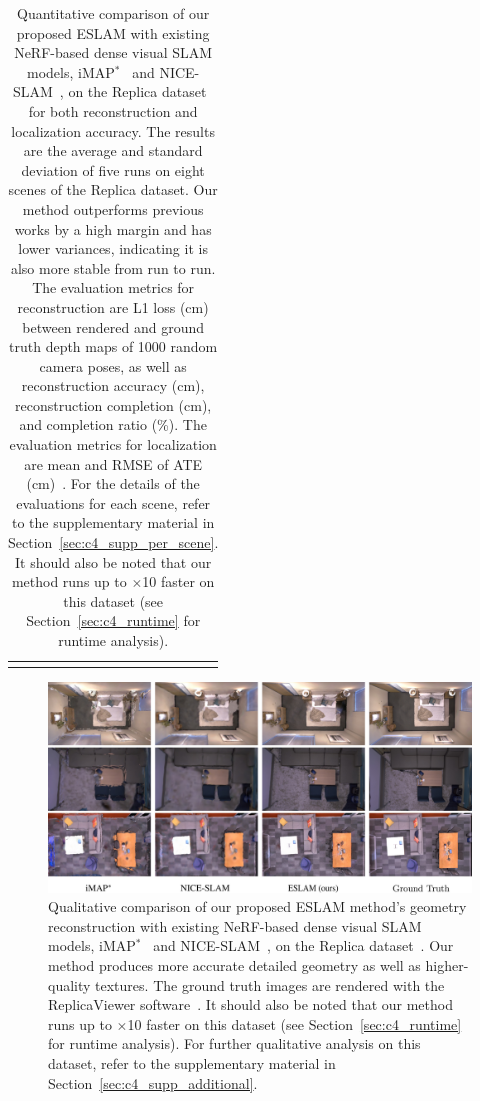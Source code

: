 \begin{table}[t]
\begin{center}
\begin{tabular}{l|cccc}
            \Xhline{2\arrayrulewidth}
        \end{tabular}
    \end{center}
    \caption{Quantitative comparison of our proposed ESLAM with existing NeRF-based dense visual SLAM models, iMAP$^{*}$~\citep{sucar2021imap} and NICE-SLAM~\citep{zhu2022nice}, on the Replica dataset~\citep{replica19arxiv} for both reconstruction and localization accuracy. The results are the average and standard deviation of five runs on eight scenes of the Replica dataset. Our method outperforms previous works by a high margin and has lower variances, indicating it is also more stable from run to run. The evaluation metrics for reconstruction are L1 loss (cm) between rendered and ground truth depth maps of 1000 random camera poses, as well as reconstruction accuracy (cm), reconstruction completion (cm), and completion ratio (\%). The evaluation metrics for localization are mean and RMSE of ATE (cm)~\citep{sturm2012benchmark}. For the details of the evaluations for each scene, refer to the supplementary material in Section~\ref{sec:c4_supp_per_scene}. It should also be noted that our method runs up to $\times$10 faster on this dataset (see Section~\ref{sec:c4_runtime} for runtime analysis).}
    \label{table:quantitative_replica}
\end{table}

\begin{figure}[t]
    \begin{center}
        \includegraphics[width=1.0\linewidth]{images/chapter4/figures/Fig3.jpg}
    \end{center}
    \caption{Qualitative comparison of our proposed ESLAM method's geometry reconstruction with existing NeRF-based dense visual SLAM models, iMAP$^*$~\citep{sucar2021imap} and NICE-SLAM~\citep{zhu2022nice}, on the Replica dataset~\citep{replica19arxiv}. Our method produces more accurate detailed geometry as well as higher-quality textures. The ground truth images are rendered with the ReplicaViewer software~\citep{replica19arxiv}. It should also be noted that our method runs up to $\times$10 faster on this dataset (see Section~\ref{sec:c4_runtime} for runtime analysis). For further qualitative analysis on this dataset, refer to the supplementary material in Section~\ref{sec:c4_supp_additional}.}
    \label{fig:c4_qualitative_replica}
\end{figure}

